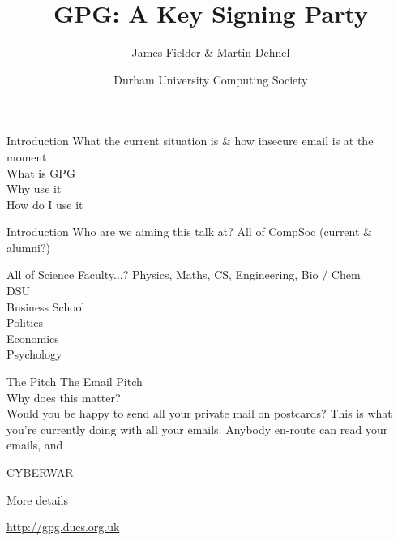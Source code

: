 \documentclass[xcolor=dvipsnames,usepdftitle=false]{beamer}
\title[GPG Key Signing Party]{GPG: A Key Signing Party}
\author{James Fielder \& Martin Dehnel}
\institute[Durham]{}
\date[14 May 2012]{Durham University Computing Society}
\institute[Durham]{\texttt{[image: pictures/logo\_purple.eps]}}
\newcommand{\MyLogo}{%
	\begin{textblock}{14}(119.0,1.0) %
		\texttt{[image: pictures/logo\_only.eps]}
	\end{textblock}
}
\begin{document}
\frame[plain]{\titlepage}



\begin{frame}{Introduction}
What the current situation is \& how insecure email is at the moment \\
What is GPG\\
Why use it\\
How do I use it\\


\end{frame}

\begin{frame}{Introduction}
Who are we aiming this talk at?
All of CompSoc (current \& alumni?)

All of Science Faculty...?
Physics, Maths, CS, Engineering, Bio / Chem\\

DSU\\

Business School\\
Politics\\
Economics\\
Psychology


\end{frame}



\begin{frame}{The Pitch}
The Email Pitch\\

Why does this matter?\\

Would you be happy to send all your private mail on postcards? This is what you're currently doing with all your emails. Anybody en-route can read your emails, and 

CYBERWAR




\end{frame}


\begin{frame}{More details}

\url{http://gpg.ducs.org.uk}

\end{frame}
\end{document}
